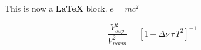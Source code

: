 This is now a \textbf{LaTeX} block. $e=mc^2$

\begin{equation}
\frac{V_{ sup}^2}{V_{ norm}^2} = [1 + \Delta \nu \, \tau \, T^2 ]^{-1} \,
\end{equation}